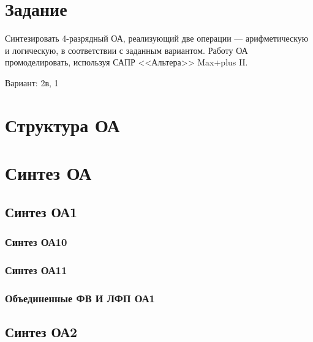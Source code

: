 
\newpage
\section{Задание}

Синтезировать 4-разрядный ОА, реализующий две операции --- арифметическую и логическую, в соответствии с заданным вариантом. Работу ОА промоделировать, используя САПР <<Альтера>> Max+plus II.

Вариант: 2в, 1



\newpage
\section{Структура ОА}

\newpage
\section{Синтез ОА}

\subsection{Синтез ОА1}

\subsubsection{Синтез ОА10}




\subsubsection{Синтез ОА11}



\subsubsection{Объединенные ФВ И ЛФП ОА1}

\subsection{Синтез ОА2}
